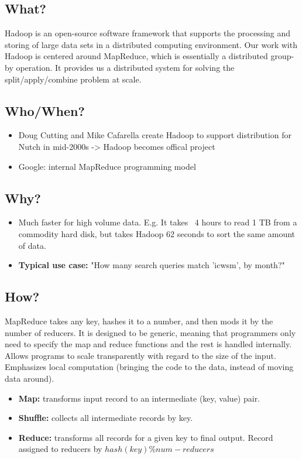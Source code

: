 \subsection{What?}
Hadoop is an open-source software framework that supports the processing and storing of large data sets in a distributed computing environment. Our work with Hadoop is centered around MapReduce, which is essentially a distributed group-by operation. It provides us a distributed system for solving the split/apply/combine problem at scale.
\subsection{Who/When?}
\begin{itemize}
\item Doug Cutting and Mike Cafarella create Hadoop to support distribution for Nutch in mid-2000s -> Hadoop becomes offical project
\item Google: internal MapReduce programming model
\end{itemize}
\subsection{Why?}
\begin{itemize}
\item Much faster for high volume data. E.g. It takes ~4 hours to read 1 TB from a commodity hard disk, but takes Hadoop 62 seconds to sort the same amount of data.
\item \textbf{Typical use case:} "How many search queries match 'icwsm', by month?"
\end{itemize}
\subsection{How?}
MapReduce takes any key, hashes it to a number, and then mods it by the number of reducers. It is designed to be generic, meaning that programmers only need to specify the map and reduce functions and the rest is handled internally. Allows programs to scale transparently with regard to the size of the input. Emphasizes local computation (bringing the code to the data, instead of moving data around). 
\begin{itemize}
\item \textbf{Map:} transforms input record to an intermediate (key, value) pair.
\item \textbf{Shuffle:} collects all intermediate records by key.
\item \textbf{Reduce:} transforms all records for a given key to final output. Record assigned to reducers by $hash(key) \% num-reducers$
\end{itemize}
